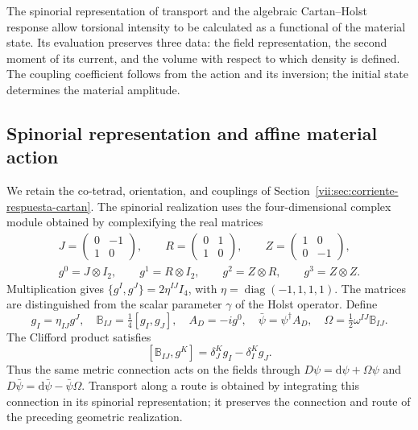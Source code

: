 The spinorial representation of transport and the algebraic
Cartan--Holst response allow torsional intensity to be calculated as a
functional of the material state. Its evaluation preserves three data:
the field representation, the second moment of its current, and
the volume with respect to which density is defined. The coupling
coefficient follows from the action and its inversion; the initial state
determines the material amplitude.

\subsection{Spinorial representation and affine material action}
\label{vii:subsec:accion-espinorial-afin}

We retain the co-tetrad, orientation, and couplings of
Section~\ref{vii:sec:corriente-respuesta-cartan}. The spinorial
realization uses the four-dimensional complex module obtained by
complexifying the real matrices
\begin{equation}
 \begin{gathered}
 J=\begin{pmatrix}0&-1\\1&0\end{pmatrix},\qquad
 R=\begin{pmatrix}0&1\\1&0\end{pmatrix},\qquad
 Z=\begin{pmatrix}1&0\\0&-1\end{pmatrix},\\
 g^0=J\otimes I_2,\qquad g^1=R\otimes I_2,\qquad
 g^2=Z\otimes R,\qquad g^3=Z\otimes Z.
 \end{gathered}
 \label{vii:eq:clifford-material-explicito}
\end{equation}
Multiplication gives
\(\{g^I,g^J\}=2\eta^{IJ}I_4\), with
\(\eta=\operatorname{diag}(-1,1,1,1)\). The matrices are distinguished
from the scalar parameter \(\gamma\) of the Holst operator. Define
\begin{equation}
 g_I=\eta_{IJ}g^J,\quad
 \mathbb B_{IJ}=\tfrac14[g_I,g_J],\quad
 A_D=-i g^0,\quad \bar\psi=\psi^\dagger A_D,\quad
 \Omega=\tfrac12\omega^{IJ}\mathbb B_{IJ}.
 \label{vii:eq:adjunto-conexion-espinorial}
\end{equation}
The Clifford product satisfies
\[
 [\mathbb B_{IJ},g^K]=\delta_J^K g_I-\delta_I^K g_J.
\]
Thus the same metric connection acts on the fields through
\(D\psi=\mathrm d\psi+\Omega\psi\) and
\(D\bar\psi=\mathrm d\bar\psi-\bar\psi\Omega\).
Transport along a route is obtained by integrating this connection in
its spinorial representation; it preserves the connection and route of
the preceding geometric realization.

